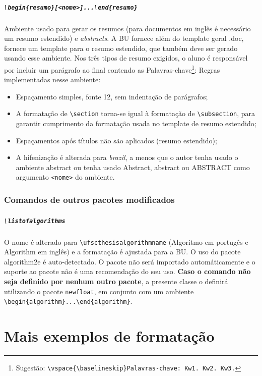 \documentclass[embeddedlogo]{ufsc-thesis-rn46-2019}
\newcommand{\lacmd}[1]{\texttt{\textbackslash{}#1}}
\newcommand{\laenvi}[2]{\texttt{\textbackslash{}begin\{#1\}[#2]...\textbackslash{}end\{#1\}}}
\begin{document}
\paragraph*{\laenvi{resumo}{<nome>}}
Ambiente usado para gerar os resumos (para documentos em inglês é necessário um
resumo estendido) e \emph{abstracts}. A BU fornece além do template geral .doc,
fornece um template para o resumo estendido, que também deve ser gerado usando
esse ambiente. Nos três tipos de resumo exigidos, o aluno é responsável por
incluir um parágrafo ao final contendo as Palavras-chave\footnote{Sugestão:
  \lacmd{vspace\{\lacmd{baselineskip}\}Palavras-chave: Kw1. Kw2. Kw3.}}: Regras
implementadas nesse ambiente:
\begin{itemize}
\item Espaçamento simples, fonte 12, sem indentação de parágrafos;
\item A formatação de \lacmd{section} torna-se igual à formatação de
  \lacmd{subsection}, para garantir cumprimento da formatação usada no template de
  resumo estendido;
\item Espaçamentos após títulos não são aplicados (resumo estendido);
\item A hifenização é alterada para \textit{brazil}, a menos que o autor tenha
  usado o ambiente abstract ou tenha usado Abstract, abstract ou ABSTRACT como
  argumento \texttt{<nome>} do ambiente.
\end{itemize}

\subsection{Comandos de outros pacotes modificados}

\paragraph*{\lacmd{listofalgorithms}} O nome é alterado para
\lacmd{ufscthesisalgorithmname} (Algoritmo em portugês e Algorithm em inglês) e
a formatação é ajustada para a BU. O uso do pacote algorithm2e é
auto-detectado. O pacote não será importado automáticamente e o suporte ao
pacote não é uma recomendação do seu uso. \textbf{Caso o comando não seja
  definido por nenhum outro pacote}, a presente classe o definirá utilizando o
pacote \texttt{newfloat}, em conjunto com um ambiente
\lacmd{begin\{algorithm\}...\lacmd{end\{algorithm\}}}.


\chapter{Mais exemplos de formatação}
\label{ch:ex}
\end{document}
